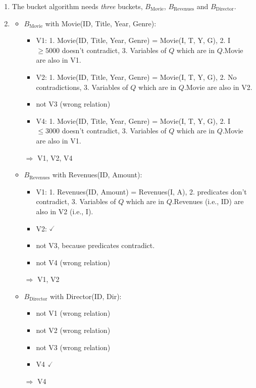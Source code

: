 \documentclass{scrartcl}
\begin{document}
	\begin{enumerate}
		\item The bucket algorithm needs \textit{three} buckets, $B_\text{Movie}$, $B_\text{Revenues}$ and $B_\text{Director}$.
		
		\item\phantom{phantom}
		\begin{itemize}
			\item $B_\text{Movie}$ with Movie(ID, Title, Year, Genre):
			\begin{itemize}
				\item V1: 1. Movie(ID, Title, Year, Genre) = Movie(I, T, Y, G), 2. I $\geq5000$ doesn't contradict, 3. Variables of $Q$ which are in $Q$.Movie are also in V1.
				\item V2: 1. Movie(ID, Title, Year, Genre) = Movie(I, T, Y, G), 2. No contradictions, 3. Variables of $Q$ which are in $Q$.Movie are also in V2.
				\item not V3 (wrong relation)
				\item V4: 1. Movie(ID, Title, Year, Genre) = Movie(I, T, Y, G), 2. I $\leq3000$ doesn't contradict, 3. Variables of $Q$ which are in $Q$.Movie are also in V1.
			\end{itemize}
			$\Rightarrow$ V1, V2, V4
			
			\item $B_\text{Revenues}$ with Revenues(ID, Amount):
			\begin{itemize}
				\item V1: 1. Revenues(ID, Amount) = Revenues(I, A), 2. predicates don't contradict, 3. Variables of $Q$ which are in $Q$.Revenues (i.e., ID) are also in V2 (i.e., I).
				\item V2: $\checked$
				\item not V3, because predicates contradict.
				\item not V4 (wrong relation)
			\end{itemize}
			$\Rightarrow$ V1, V2
			
			\item $B_\text{Director}$ with Director(ID, Dir):
			\begin{itemize}
				\item not V1 (wrong relation)
				\item not V2 (wrong relation)
				\item not V3 (wrong relation)
				\item V4 $\checked$
			\end{itemize}
			$\Rightarrow$ V4
		\end{itemize}
		

\end{enumerate}
\end{document}
